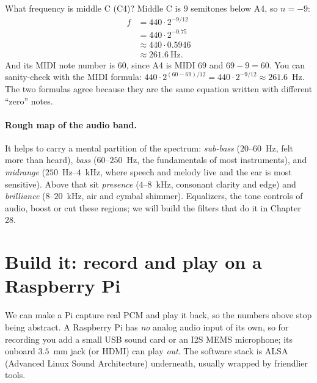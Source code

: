 \begin{example}
\label{ch26:ex-note}
What frequency is middle C (C4)? Middle C is $9$ semitones below A4, so $n = -9$:
\begin{align*}
  f &= 440 \cdot 2^{-9/12} \\
    &= 440 \cdot 2^{-0.75} \\
    &\approx 440 \cdot 0.5946 \\
    &\approx 261.6~\text{Hz}.
\end{align*}
And its MIDI note number is $60$, since A4 is MIDI $69$ and $69 - 9 = 60$. You can sanity-check
with the MIDI formula: $440 \cdot 2^{(60-69)/12} = 440 \cdot 2^{-9/12} \approx 261.6$~Hz. The two
formulas agree because they are the same equation written with different ``zero'' notes.
\end{example}

\paragraph{Rough map of the audio band.} It helps to carry a mental partition of the spectrum:
\emph{sub-bass} ($20$--$60$~Hz, felt more than heard), \emph{bass} ($60$--$250$~Hz, the fundamentals of
most instruments), and \emph{midrange} ($250$~Hz--$4$~kHz, where speech and melody live and the ear is
most sensitive). Above that sit \emph{presence} ($4$--$8$~kHz, consonant clarity and edge) and
\emph{brilliance} ($8$--$20$~kHz, air and cymbal shimmer). Equalizers, the tone controls of audio,
boost or cut these regions; we will build the filters that do it in Chapter 28.

\section{Build it: record and play on a Raspberry Pi}
\label{ch26:build}

We can make a Pi capture real PCM and play it back, so the numbers above stop
being abstract. A Raspberry Pi has \emph{no} analog audio input of its own, so for recording you
add a small USB sound card or an I2S MEMS microphone; its onboard $3.5$~mm jack (or HDMI) can play
\emph{out}. The software stack is ALSA (Advanced Linux Sound Architecture) underneath, usually wrapped by friendlier tools.

